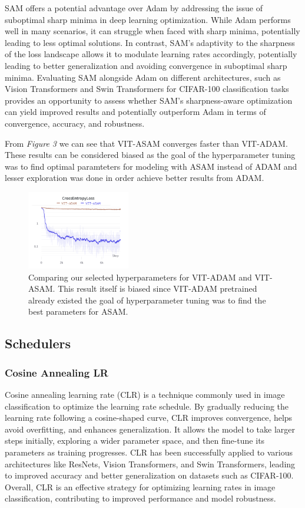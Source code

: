 \documentclass{article}
\begin{document}
SAM offers a potential advantage over Adam by addressing the issue of suboptimal sharp minima in deep learning optimization. 
While Adam performs well in many scenarios, it can struggle when faced with sharp minima, potentially leading to less optimal solutions. 
In contrast, SAM's adaptivity to the sharpness of the loss landscape allows it to modulate learning rates accordingly, potentially leading to better generalization and avoiding convergence in suboptimal sharp minima. 
Evaluating SAM alongside Adam on different architectures, such as Vision Transformers and Swin Transformers for CIFAR-100 classification tasks provides an opportunity to assess whether SAM's sharpness-aware optimization can yield improved results and potentially outperform Adam in terms of convergence, accuracy, and robustness.

From \textit{Figure 3} we can see that VIT-ASAM converges faster than VIT-ADAM. 
These results can be considered biased as the goal of the hyperparameter tuning was to find optimal paramteters for modeling with ASAM instead of ADAM and lesser exploration was done in order achieve better results from ADAM.


\begin{figure}[ht]
    \vskip 0.2in
    \centering
    \includegraphics[width=0.4\textwidth]{optimizers.png}
    \caption{Comparing our selected hyperparameters for VIT-ADAM and VIT-ASAM. This result itself is biased since VIT-ADAM pretrained already existed the goal of hyperparameter tuning was to find the best parameters for ASAM.}
    \label{fig:foobar}
    \vskip -0.2in
\end{figure}

\subsection{Schedulers}
\subsubsection{Cosine Annealing LR}
Cosine annealing learning rate (CLR) is a technique commonly used in image classification to optimize the learning rate schedule. 
By gradually reducing the learning rate following a cosine-shaped curve, CLR improves convergence, helps avoid overfitting, and enhances generalization. 
It allows the model to take larger steps initially, exploring a wider parameter space, and then fine-tune its parameters as training progresses. 
CLR has been successfully applied to various architectures like ResNets, Vision Transformers, and Swin Transformers, leading to improved accuracy and better generalization on datasets such as CIFAR-100. 
Overall, CLR is an effective strategy for optimizing learning rates in image classification, contributing to improved performance and model robustness.
\end{document}
